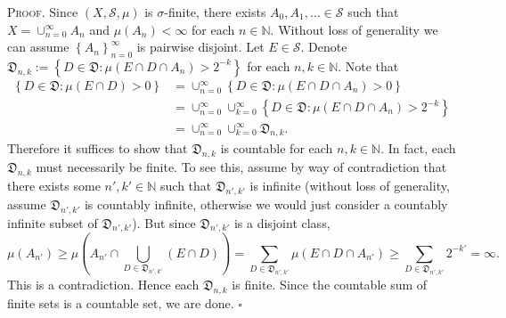\documentclass[12pt]{article}
\newcounter{ProofCounter}
\newenvironment{Proof}{\stepcounter{ProofCounter}\textsc{Proof.}}{\hfill$\square$}
\begin{document}
\begin{Proof}
Since $(X, \mathcal{S}, \mu)$ is $\sigma$-finite, there exists $A_{0}, A_{1}, \hdots \in \mathcal{S}$ such that $X = \cup_{n=0}^{\infty}A_{n}$ and
$\mu(A_{n}) < \infty$ for each $n \in \mathbb{N}$. Without loss of generality we can assume $\left\{ A_{n} \right\}_{n=0}^{\infty}$ is pairwise
disjoint. Let $E \in \mathcal{S}$. Denote $\mathfrak{D}_{n,k} := \left\{ D \in \mathfrak{D} : \mu(E\cap D\cap A_{n}) > 2^{-k} \right\}$ for each $n,k
\in \mathbb{N}$. Note that 
\begin{align*}
\left\{ D \in \mathfrak{D} : \mu(E \cap D) > 0 \right\} & = \cup_{n=0}^{\infty}\left\{ D \in \mathfrak{D} : \mu(E\cap D\cap A_{n}) > 0 \right\} \\
& = \cup_{n=0}^{\infty}\cup_{k=0}^{\infty}\left\{ D \in \mathfrak{D} : \mu(E\cap D\cap A_{n}) > 2^{-k} \right\} \\
& = \cup_{n=0}^{\infty}\cup_{k=0}^{\infty}\mathfrak{D}_{n,k}.
\end{align*}
Therefore it suffices to show that $\mathfrak{D}_{n,k}$ is countable for each $n,k \in \mathbb{N}$. In fact, each $\mathfrak{D}_{n,k}$ must
necessarily be finite. To see this, assume by way of contradiction that there exists some $n', k' \in \mathbb{N}$ such that $\mathfrak{D}_{n',k'}$ is
infinite (without loss of generality, assume $\mathfrak{D}_{n',k'}$ is countably infinite, otherwise we would just consider a countably infinite
subset of $\mathfrak{D}_{n',k'}$). But since $\mathfrak{D}_{n',k'}$ is a disjoint class, 
\[ \mu(A_{n'}) \geq \mu\left(A_{n'}\cap \bigcup_{D\in\mathfrak{D}_{n',k'}}(E\cap D)\right) = \sum_{D\in \mathfrak{D}_{n',k'}}\mu(E\cap D\cap A_{n'}) 
\geq \sum_{D\in\mathfrak{D}_{n',k'}}2^{-k'} = \infty. \]
This is a contradiction. Hence each $\mathfrak{D}_{n,k}$ is finite. Since the countable sum of finite sets is a countable set, we are done.
\end{Proof}
\end{document}
